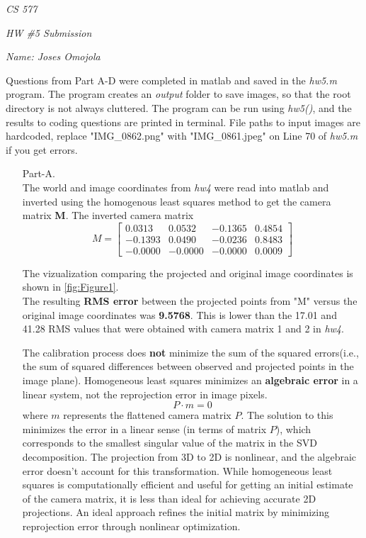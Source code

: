 \documentclass[12pt]{report}
\begin{document}
\centerline{\it CS 577}
\centerline{\it HW \#5 Submission}
\centerline{\it Name: Joses Omojola}

Questions from Part A-D were completed in matlab and saved in the \emph{hw5.m} program. The program creates an \emph{output} folder to save images, 
so that the root directory is not always cluttered. The program can be run using \textit{hw5()}, and the results to coding questions are printed in 
terminal. File paths to input images are hardcoded, replace "IMG\_0862.png" with "IMG\_0861.jpeg" on Line 70 of \emph{hw5.m} if you get errors.

\begin{enumerate}

    \item[Part-A.]
    \ \\
    The world and image coordinates from \emph{hw4} were read into matlab and inverted using the homogenous least squares method to get the camera 
    matrix \textbf{M}. The inverted camera matrix 
    \[
    M = 
    \begin{bmatrix}
    0.0313 & 0.0532 & -0.1365 & 0.4854 \\
    -0.1393 & 0.0490 & -0.0236 & 0.8483 \\
    -0.0000 & -0.0000 & -0.0000 & 0.0009
    \end{bmatrix}
    \]

    The vizualization comparing the projected and original image coordinates is shown in \autoref{fig:Figure1}.\\
    The resulting \textbf{RMS error} between the projected points from "M" versus the original image coordinates was \textbf{9.5768}. This is lower than 
    the 17.01 and 41.28 RMS values that were obtained with camera matrix 1 and 2 in \emph{hw4}.  
    
    The calibration process does \textbf{not} minimize the sum of the squared errors(i.e., the sum of squared differences between observed and projected 
    points in the image plane). Homogeneous least squares minimizes an \textbf{algebraic error} in a linear system, not the reprojection error in image pixels. 
    $$P \cdot m = 0$$
    where $m$ represents the flattened camera matrix $P$. The solution to this minimizes the error in a linear sense (in terms of matrix $P$), which 
    corresponds to the smallest singular value of the matrix in the SVD decomposition. The projection from 3D to 2D is nonlinear, and the algebraic error 
    doesn't account for this transformation. While homogeneous least squares is computationally efficient and useful for getting an initial estimate of 
    the camera matrix, it is less than ideal for achieving accurate 2D projections. An ideal approach refines the initial matrix by minimizing reprojection 
    error through nonlinear optimization.



\end{enumerate}
\end{document}
